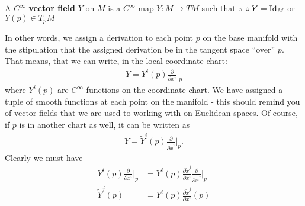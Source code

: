 \documentclass{../mathnotes}
\begin{document}
\begin{defn}
    A $C^\infty$ \textbf{vector field} $Y$ on $M$ is a $C^\infty$ map $Y:M\to TM$ such that $\pi\circ Y=\operatorname{Id}_M$ or $Y(p)\in T_pM$
\end{defn}

In other words, we assign a derivation to each point $p$ on the base manifold with the stipulation that the assigned derivation be in the
tangent space ``over'' $p$. That means, that we can write, in the local coordinate chart:
\begin{align*}
    Y=Y^i(p)\frac{\partial}{\partial x^i}\bigg|_p
\end{align*}
where $Y^i(p)$ are $C^\infty$ functions on the coordinate chart. We have assigned a tuple of smooth functions at each point on the manifold - this
should remind you of vector fields that we are used to working with on Euclidean spaces. Of course, if $p$ is in another chart as well, it can be
written as 
\begin{align*}
    Y=\tilde{Y}^i(p)\frac{\partial}{\partial \tilde{x}^i}\bigg|_p.
\end{align*}
Clearly we must have
\begin{align*}
    Y^i(p)\frac{\partial}{\partial x^i}\bigg|_p&=Y^i(p)\frac{\partial \tilde{x}^j}{\partial x^i}\frac{\partial}{\partial \tilde{x}^j}\bigg|_p\\
    \tilde{Y}^j(p)&=Y^i(p)\frac{\partial \tilde{x}^j}{\partial x^i}(p)
\end{align*}
\end{document}
